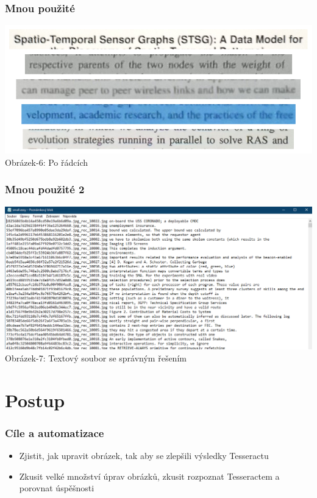 \documentclass{beamer}
\begin{document}
\begin{frame}
\frametitle{Mnou použité}
    	\begin{center}
     	\includegraphics[width=1\textwidth]{img/bmod-easy.png}\\
     	Obrázek-6: Po řádcích
     	\end{center}
\end{frame}
\begin{frame}
\frametitle{Mnou použité 2}
		\includegraphics[width=1\textwidth]{img/b-mod-text.png}\\
     	Obrázek-7: Textový soubor se správným řešením
\end{frame}
\section{Postup}
\begin{frame}
\frametitle{Cíle a automatizace}
\begin{itemize}
\item Zjistit, jak upravit obrázek, tak aby se zlepšili výsledky Tesseractu
\item Zkusit velké množství úprav obrázků, zkusit rozpoznat Tesseractem a porovnat úspěšnosti
\end{itemize}
\end{frame}
\end{document}
